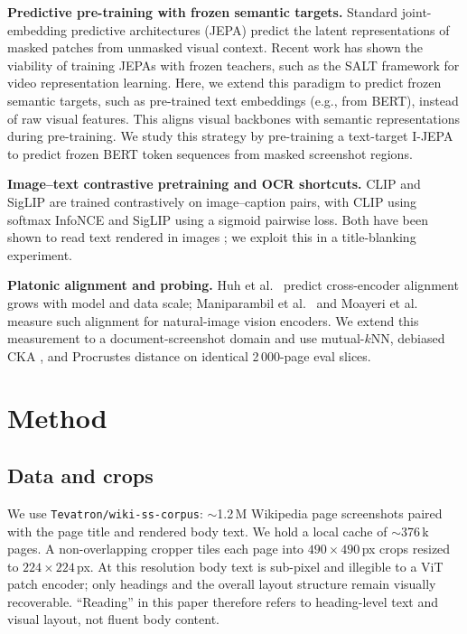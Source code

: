 \documentclass{article}
\begin{document}
\textbf{Predictive pre-training with frozen semantic targets.}
Standard joint-embedding predictive architectures (JEPA) \cite{assran2023ijepa} predict the latent representations of masked patches from unmasked visual context. Recent work has shown the viability of training JEPAs with frozen teachers, such as the SALT framework \cite{li2025salt} for video representation learning. Here, we extend this paradigm to predict frozen semantic targets, such as pre-trained text embeddings (e.g., from BERT), instead of raw visual features. This aligns visual backbones with semantic representations during pre-training. We study this strategy by pre-training a text-target I-JEPA to predict frozen BERT token sequences from masked screenshot regions.

\textbf{Image--text contrastive pretraining and OCR shortcuts.}
CLIP \cite{radford2021clip} and SigLIP \cite{zhai2023siglip} are
trained contrastively on image--caption pairs, with CLIP using
softmax InfoNCE and SigLIP using a sigmoid pairwise loss. Both
have been shown to read text rendered in images
\cite{materzynska2022spelling, lin2024parrot}; we exploit this in a
title-blanking experiment.

\textbf{Platonic alignment and probing.} Huh et al.\
\cite{huh2024platonic} predict cross-encoder alignment grows with
model and data scale; Maniparambil et al.\
\cite{maniparambil2024crossencoder} and Moayeri et al.\
\cite{moayeri2023text2concept} measure such alignment for
natural-image vision encoders. We extend this measurement to a
document-screenshot domain and use mutual-$k$NN, debiased CKA
\cite{kornblith2019cka, murphy2024align}, and Procrustes distance
on identical 2\,000-page eval slices.

\section{Method}
\label{sec:method}

\subsection{Data and crops}
\label{sec:data}

We use \texttt{Tevatron/wiki-ss-corpus}: $\sim$1.2\,M Wikipedia page
screenshots paired with the page title and rendered body text. We
hold a local cache of $\sim$376\,k pages. A non-overlapping cropper
tiles each page into $490\times490$\,px crops resized to
$224\times224$\,px. At this resolution body text is sub-pixel and
illegible to a ViT patch encoder; only headings and the overall
layout structure remain visually recoverable. ``Reading'' in this
paper therefore refers to heading-level text and visual layout, not
fluent body content.
\end{document}
